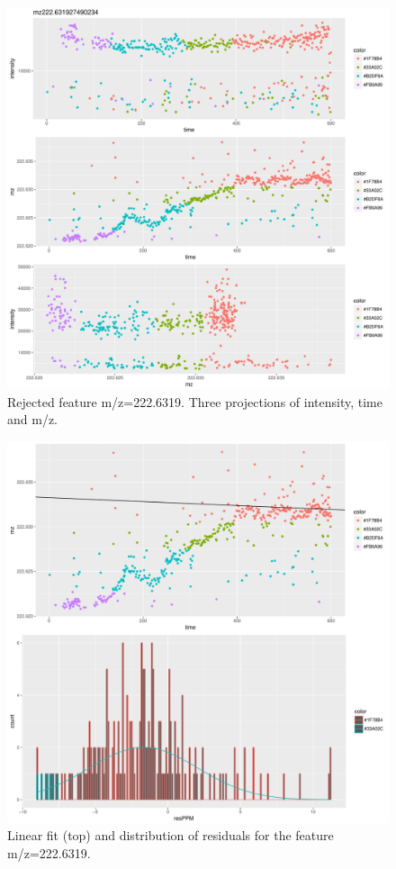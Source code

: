 \documentclass[]{article}
\begin{document}
\begin{figure}[H]
\begin{center}
\includegraphics{Supplementary_document_files/figure-latex/cluster.mz.222-1.pdf}
\caption{Rejected feature m/z=222.6319. Three projections of intensity, time and m/z.}
\label{fig:d3.mz.222.6319}
\end{center}
\end{figure}


\begin{figure}[H]
\begin{center}
\includegraphics{Supplementary_document_files/figure-latex/filter.lm.222-1.pdf}
\caption{Linear fit (top) and distribution of residuals for the  feature m/z=222.6319.}
\label{fig:chk.mz.222.6319}
\end{center}
\end{figure}
\end{document}
